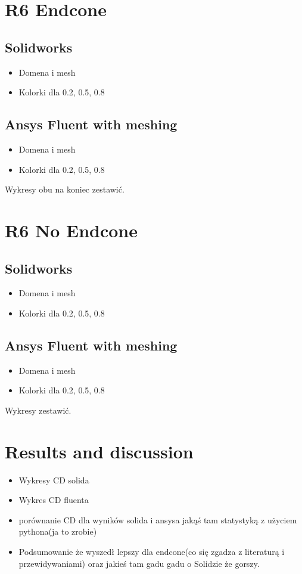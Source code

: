 \documentclass{article}
\begin{document}
\section{R6 Endcone}
\subsection{Solidworks}
\begin{itemize}
    \item Domena i mesh
    \item Kolorki dla 0.2, 0.5, 0.8
\end{itemize}
\subsection{Ansys Fluent with meshing}
\begin{itemize}
    \item Domena i mesh
    \item Kolorki dla 0.2, 0.5, 0.8
\end{itemize}
Wykresy obu na koniec zestawić.

\section{R6 No Endcone}
\subsection{Solidworks}
\begin{itemize}
    \item Domena i mesh
    \item Kolorki dla 0.2, 0.5, 0.8
\end{itemize}
\subsection{Ansys Fluent with meshing}
\begin{itemize}
    \item Domena i mesh
    \item Kolorki dla 0.2, 0.5, 0.8
\end{itemize}
Wykresy zestawić.

\section{Results and discussion}
\begin{itemize}
    \item Wykresy CD solida
    \item Wykres CD fluenta
    \item porównanie CD dla wyników solida i ansysa jakąś tam statystyką z użyciem pythona(ja to zrobie)
    \item Podsumowanie że wyszedł lepszy dla endcone(co się zgadza z literaturą i przewidywaniami) 
    oraz jakieś tam gadu gadu o Solidzie że gorszy. 
\end{itemize}
\end{document}
